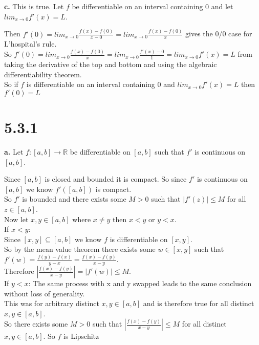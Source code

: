 \documentclass{article}
\begin{document}
{\Large\textbf{c.}} This is true. Let $f$ be differentiable on an interval containing 0 and let $lim_{x\rightarrow 0} f'(x) = L$.
\begin{center}
    \doublespacing
    Then $f'(0) = lim_{x\rightarrow 0}\frac{f(x) - f(0)}{x - 0} = lim_{x\rightarrow 0}\frac{f(x) - f(0)}{x}$ gives the 0/0 case for L'hospital's rule.
    \\So $f'(0) = lim_{x\rightarrow 0}\frac{f(x) - f(0)}{x} = lim_{x\rightarrow 0}\frac{f'(x) - 0}{1} = lim_{x\rightarrow 0} f'(x) = L$ from taking the derivative of the top and bottom and using the algebraic differentiability theorem.
    \\So if $f$ is differentiable on an interval containing 0 and $lim_{x\rightarrow 0} f'(x) = L$ then $f'(0) = L$ \qedsymbol
\end{center}


\newpage
\section*{5.3.1}

{\Large\textbf{a.}} Let $f:[a,b]\rightarrow\mathbb{R}$ be differentiable on $[a,b]$ such that $f'$ is continuous on $[a,b]$.
\begin{center}
    \doublespacing
    Since $[a, b]$ is closed and bounded it is compact. So since $f'$ is continuous on $[a, b]$ we know $f'([a, b])$ is compact.
    \\So $f'$ is bounded and there exists some $M > 0$ such that $|f'(z)|\leq M$ for all $z\in [a, b]$.
    \\Now let $x, y\in [a, b]$ where $x\neq y$ then $x < y$ or $y < x$.
    \\If $x < y$:
    \\Since $[x, y]\subseteq [a, b]$ we know $f$ is differentiable on $[x, y]$.
    \\So by the mean value theorem there exists some $w\in [x, y]$ such that $f'(w) =\frac{f(y) - f(x)}{y - x} =\frac{f(x) - f(y)}{x - y}$.
    \\Therefore $|\frac{f(x) - f(y)}{x - y}| = |f'(w)|\leq M$.
    \\If $y < x$: The same process with x and y swapped leads to the same conclusion without loss of generality.
    \\This was for arbitrary distinct $x, y\in [a, b]$ and is therefore true for all distinct $x, y\in [a, b]$.
    \\So there exists some $M > 0$ such that $|\frac{f(x) - f(y)}{x - y}|\leq M$ for all distinct $x, y\in [a, b]$. So $f$ is Lipschitz \qedsymbol
\end{center}
\end{document}
